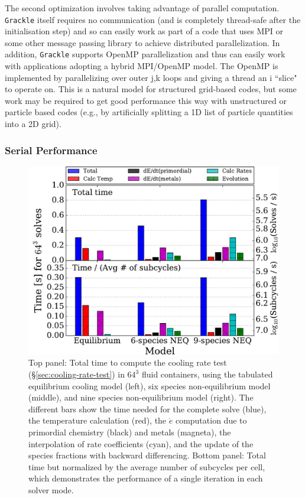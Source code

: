 The second optimization involves taking advantage of parallel computation.  \texttt{Grackle} itself requires no communication (and is completely thread-safe after the initialisation step) and so can easily work as part of a code that uses MPI or some other message passing library to achieve distributed parallelization.  In addition, \texttt{Grackle} supports OpenMP parallelization and thus can easily work with applications adopting a hybrid MPI/OpenMP model.  The OpenMP is implemented by parallelizing over outer j,k loops and giving a thread an i ``slice" to operate on.  This is a natural model for structured grid-based codes, but some work may be required to get good performance this way with unstructured or particle based codes (e.g., by artificially splitting a 1D list of particle quantities into a 2D grid).

\subsubsection{Serial Performance}

\begin{figure}
  \centering
  \includegraphics[width=\columnwidth]{performance.pdf}
  \caption{Top panel: Total time to compute the cooling rate test
    (\S\ref{sec:cooling-rate-test}) in $64^3$ fluid containers, using
    the tabulated equilibrium cooling model (left), six species
    non-equilibrium model (middle), and nine species non-equilibrium
    model (right).  The different bars show the time needed for the
    complete solve (blue), the temperature calculation (red), the
    $\dot{e}$ computation due to primordial chemistry (black) and
    metals (magneta), the interpolation of rate coefficients (cyan),
    and the update of the species fractions with backward
    differencing.  Bottom panel: Total time but normalized by the
    average number of subcycles per cell, which demonstrates the
    performance of a single iteration in each solver
    mode.} \label{fig:performance}
\end{figure}

